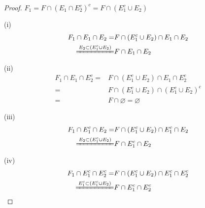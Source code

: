 \documentclass[12pt, a4paper, oneside]{ctexart}
\begin{document}
\begin{proof}
    $F_1=F\cap(E_1\cap E_2^c)^c = F\cap(E_1^c\cup E_2)$

    (i)\begin{equation*}
        \begin{aligned}
            F_1\cap E_1\cap E_2=&F\cap(E_1^c\cup E_2)\cap E_1\cap E_2\\
            \xlongequal{E_2\subset (E_1^c\cup E_2)}&F\cap E_1\cap E_2
        \end{aligned}
    \end{equation*}

    (ii) \begin{equation*}
        \begin{aligned}
            F_1\cap E_1\cap E_2^c=&F\cap(E_1^c\cup E_2)\cap E_1\cap E_2^c\\
            =&F\cap(E_1^c\cup E_2)\cap(E_1^c\cup E_2)^c\\
            =& F\cap \varnothing = \varnothing
        \end{aligned}
    \end{equation*}

    (iii) \begin{equation*}
        \begin{aligned}
            F_1\cap E_1^c\cap E_2=&F\cap(E_1^c\cup E_2)\cap E_1^c\cap E_2\\
            \xlongequal{E_2\subset (E_1^c\cup E_2)}&F\cap E_1^c\cap E_2
        \end{aligned}
    \end{equation*}

    (iv) \begin{equation*}
        \begin{aligned}
            F_1\cap E_1^c\cap E_2^c=&F\cap(E_1^c\cup E_2)\cap E_1^c\cap E_2^c\\
            \xlongequal{E_1^c\subset (E_1^c\cup E_2)}&F\cap E_1^c\cap E_2^c
        \end{aligned}
    \end{equation*}
\end{proof}
\end{document}
